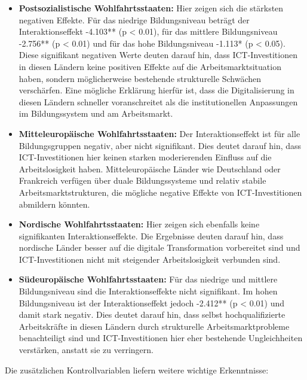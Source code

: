 \begin{itemize}
    \item \textbf{Postsozialistische Wohlfahrtsstaaten:} Hier zeigen sich 
    die stärksten negativen Effekte. Für das niedrige Bildungsniveau beträgt der 
    Interaktionseffekt -4.103** (p < 0.01), für das mittlere Bildungsniveau -2.756** (p < 0.01) und 
    für das hohe Bildungsniveau -1.113* (p < 0.05). Diese signifikant negativen Werte 
    deuten darauf hin, dass ICT-Investitionen in diesen Ländern keine positiven Effekte 
    auf die Arbeitsmarktsituation haben, sondern möglicherweise bestehende 
    strukturelle Schwächen verschärfen. Eine mögliche Erklärung hierfür ist, dass die 
    Digitalisierung in diesen Ländern schneller voranschreitet als die institutionellen 
    Anpassungen im Bildungssystem und am Arbeitsmarkt.
    
    \item \textbf{Mitteleuropäische Wohlfahrtsstaaten:} Der Interaktionseffekt ist für alle 
    Bildungsgruppen negativ, aber nicht signifikant. Dies deutet darauf hin, dass 
    ICT-Investitionen hier keinen starken moderierenden Einfluss auf die Arbeitslosigkeit 
    haben. Mitteleuropäische Länder wie Deutschland oder Frankreich verfügen über 
    duale Bildungssysteme und relativ stabile Arbeitsmarktstrukturen, die mögliche 
    negative Effekte von ICT-Investitionen abmildern könnten.
    
    \item \textbf{Nordische Wohlfahrtsstaaten:} Hier zeigen sich ebenfalls keine signifikanten 
    Interaktionseffekte. Die Ergebnisse deuten darauf hin, dass nordische Länder besser 
    auf die digitale Transformation vorbereitet sind und ICT-Investitionen nicht mit 
    steigender Arbeitslosigkeit verbunden sind.
    
    \item \textbf{Südeuropäische Wohlfahrtsstaaten:} Für das niedrige und mittlere Bildungsniveau 
    sind die Interaktionseffekte nicht signifikant. Im hohen Bildungsniveau ist der 
    Interaktionseffekt jedoch -2.412** (p < 0.01) und damit stark negativ. Dies deutet 
    darauf hin, dass selbst hochqualifizierte Arbeitskräfte in diesen Ländern durch 
    strukturelle Arbeitsmarktprobleme benachteiligt sind und ICT-Investitionen hier eher 
    bestehende Ungleichheiten verstärken, anstatt sie zu verringern.
\end{itemize}

Die zusätzlichen Kontrollvariablen liefern weitere wichtige Erkenntnisse:

